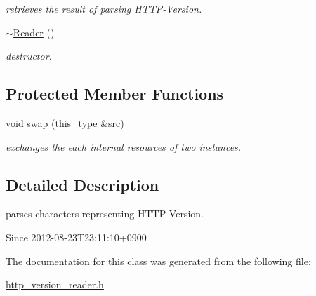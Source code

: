 \begin{DoxyCompactItemize}
\begin{DoxyCompactList}\small\item\em retrieves the result of parsing H\-T\-T\-P-\/\-Version. \end{DoxyCompactList}\item 
\hypertarget{classhryky_1_1http_1_1version_1_1_reader_a3396a4ead69ad7e3fe4b2b3fc244af07}{\hyperlink{classhryky_1_1http_1_1version_1_1_reader_a3396a4ead69ad7e3fe4b2b3fc244af07}{$\sim$\-Reader} ()}\label{classhryky_1_1http_1_1version_1_1_reader_a3396a4ead69ad7e3fe4b2b3fc244af07}

\begin{DoxyCompactList}\small\item\em destructor. \end{DoxyCompactList}\end{DoxyCompactItemize}
\subsection*{Protected Member Functions}
\begin{DoxyCompactItemize}
\item 
\hypertarget{classhryky_1_1http_1_1version_1_1_reader_ad378d8c463cdb0c1858f7be1d6156917}{void \hyperlink{classhryky_1_1http_1_1version_1_1_reader_ad378d8c463cdb0c1858f7be1d6156917}{swap} (\hyperlink{classhryky_1_1http_1_1version_1_1_reader_a75064c5aa31f02adcbdd0b6b255c5a73}{this\-\_\-type} \&src)}\label{classhryky_1_1http_1_1version_1_1_reader_ad378d8c463cdb0c1858f7be1d6156917}

\begin{DoxyCompactList}\small\item\em exchanges the each internal resources of two instances. \end{DoxyCompactList}\end{DoxyCompactItemize}


\subsection{Detailed Description}
parses characters representing H\-T\-T\-P-\/\-Version. 

\begin{DoxySince}{Since}
2012-\/08-\/23\-T23\-:11\-:10+0900 
\end{DoxySince}


The documentation for this class was generated from the following file\-:\begin{DoxyCompactItemize}
\item 
\hyperlink{http__version__reader_8h}{http\-\_\-version\-\_\-reader.\-h}\end{DoxyCompactItemize}
